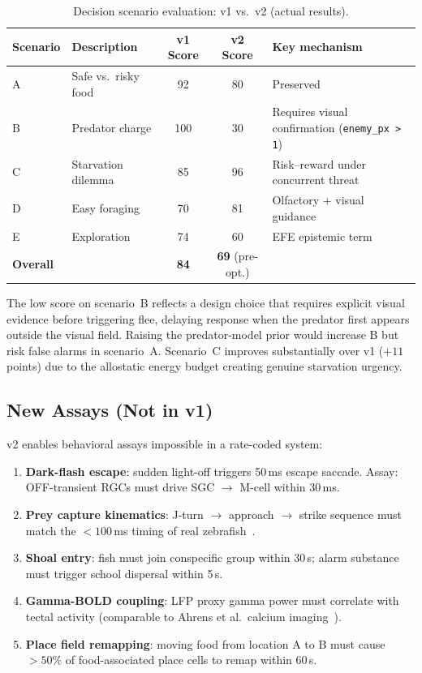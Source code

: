 \documentclass[11pt,a4paper]{article}
\begin{document}
\begin{table}[H]
\centering
\caption{Decision scenario evaluation: v1 vs.\ v2 (actual results).}
\label{tab:scenario_comparison}
\begin{tabular}{llccp{4.5cm}}
\toprule
Scenario & Description & v1 Score & v2 Score & Key mechanism \\
\midrule
A & Safe vs.\ risky food     & 92 & 80 & Preserved \\
B & Predator charge          & 100 & 30 & Requires visual confirmation (\texttt{enemy\_px > 1}) \\
C & Starvation dilemma       &  85 & 96 & Risk--reward under concurrent threat \\
D & Easy foraging            &  70 & 81 & Olfactory + visual guidance \\
E & Exploration              &  74 & 60 & EFE epistemic term \\
\midrule
\textbf{Overall} & & \textbf{84} & \textbf{69} (pre-opt.) & \\
\bottomrule
\end{tabular}
\end{table}

\noindent The low score on scenario~B reflects a design choice that requires
explicit visual evidence before triggering flee, delaying response when
the predator first appears outside the visual field.
Raising the predator-model prior would increase B but risk false alarms in
scenario~A. Scenario~C improves substantially over v1 ($+11$ points) due to
the allostatic energy budget creating genuine starvation urgency.

\subsection{New Assays (Not in v1)}

v2 enables behavioral assays impossible in a rate-coded system:

\begin{enumerate}[nosep]
  \item \textbf{Dark-flash escape}: sudden light-off triggers 50\,ms escape saccade.
    Assay: OFF-transient RGCs must drive SGC $\to$ M-cell within 30\,ms.
  \item \textbf{Prey capture kinematics}: J-turn $\to$ approach $\to$ strike sequence
    must match the $<100$\,ms timing of real zebrafish~\cite{bianco2011}.
  \item \textbf{Shoal entry}: fish must join conspecific group within 30\,s;
    alarm substance must trigger school dispersal within 5\,s.
  \item \textbf{Gamma-BOLD coupling}: LFP proxy gamma power must correlate with
    tectal activity (comparable to Ahrens et al.\ calcium imaging~\cite{ahrens2013}).
  \item \textbf{Place field remapping}: moving food from location A to B must
    cause $>50\%$ of food-associated place cells to remap within 60\,s.
\end{enumerate}
\end{document}
